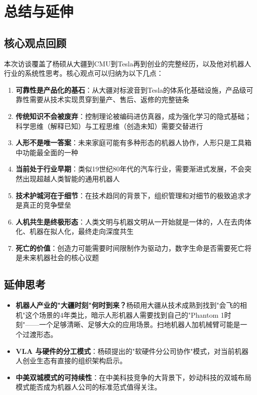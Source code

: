 \section{总结与延伸}

\subsection{核心观点回顾}

本次访谈覆盖了杨硕从大疆到CMU到Tesla再到创业的完整经历，以及他对机器人行业的系统性思考。核心观点可以归纳为以下几点：

\begin{enumerate}
    \item \textbf{可靠性是产品化的基石}：从大疆对标波音到Tesla的体系化基础设施，产品级可靠性需要从技术实现贯穿到量产、售后、返修的完整链条
    \item \textbf{传统知识不会被废弃}：控制理论被编码进仿真器，成为强化学习的隐式基础；科学思维（解释已知）与工程思维（创造未知）需要交替进行
    \item \textbf{人形不是唯一答案}：未来家庭可能有多种形态的机器人协作，人形只是工具箱中功能最全面的一种
    \item \textbf{当前处于行业早期}：类似19世纪80年代的汽车行业，需要渐进式发展，不会突然出现超越人类智能的通用机器人
    \item \textbf{技术护城河在于细节}：在技术趋同的背景下，组织管理和对细节的极致追求才是真正的竞争壁垒
    \item \textbf{人机共生是终极形态}：人类文明与机器文明从一开始就是一体的，人在去肉体化、机器在拟人化，最终走向深度共生
    \item \textbf{死亡的价值}：创造力可能需要时间限制作为驱动力，数字生命是否需要死亡将是未来机器社会的核心议题
\end{enumerate}

\subsection{延伸思考}

\begin{itemize}
    \item \textbf{机器人产业的"大疆时刻"何时到来？}杨硕用大疆从技术成熟到找到"会飞的相机"这个场景的4年类比，暗示人形机器人需要找到自己的"Phantom 1时刻"——一个足够清晰、足够大众的应用场景。扫地机器人加机械臂可能是一个过渡形态。
    \item \textbf{VLA 与硬件的分工模式}：杨硕提出的"软硬件分公司协作"模式，对当前机器人创业生态有直接的组织架构启示。
    \item \textbf{中美双城模式的可持续性}：在中美科技竞争的大背景下，妙动科技的双城布局模式能否成为机器人公司的标准范式值得关注。
\end{itemize}

